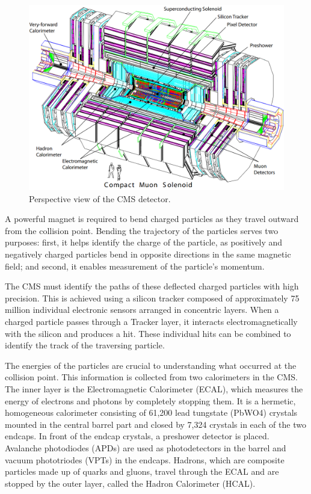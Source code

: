 \begin{center}
  \begin{figure}[ht]
    \centering
    \includegraphics[scale=.3]{Chapter2/CMS_detector_simple.png}
    \caption[Perspective view of the CMS detector]{Perspective view of the CMS detector.}
    \label{detector_CMS}
  \end{figure}
\end{center}

A powerful magnet is required to bend charged particles as they travel outward from the collision point. Bending the trajectory of the particles serves two purposes: first, it helps identify the charge of the particle, as positively and negatively charged particles bend in opposite directions in the same magnetic field; and second, it enables measurement of the particle's momentum.

The CMS must identify the paths of these deflected charged particles with high precision. This is achieved using a silicon tracker composed of approximately 75 million individual electronic sensors arranged in concentric layers. When a charged particle passes through a Tracker layer, it interacts electromagnetically with the silicon and produces a hit. These individual hits can be combined to identify the track of the traversing particle.

The energies of the particles are crucial to understanding what occurred at the collision point. This information is collected from two calorimeters in the CMS. The inner layer is the Electromagnetic Calorimeter (ECAL), which measures the energy of electrons and photons by completely stopping them. It is a hermetic, homogeneous calorimeter consisting of 61,200 lead tungstate (PbWO4) crystals mounted in the central barrel part and closed by 7,324 crystals in each of the two endcaps. In front of the endcap crystals, a preshower detector is placed. Avalanche photodiodes (APDs) are used as photodetectors in the barrel and vacuum phototriodes (VPTs) in the endcaps. Hadrons, which are composite particles made up of quarks and gluons, travel through the ECAL and are stopped by the outer layer, called the Hadron Calorimeter (HCAL).

